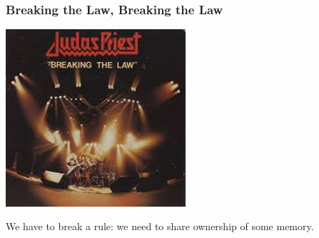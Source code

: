 \begin{frame}
\frametitle{Breaking the Law, Breaking the Law}

\begin{center}
	\includegraphics[width=0.5\textwidth]{images/judaspriest.jpg}
\end{center}

We have to break a rule: we need to share ownership of some memory. 

\end{frame}




